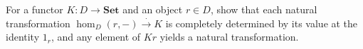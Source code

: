 For a functor $K: D \rightarrow \mathbf{Set}$ and an object $r \in D$, show that each natural transformation $\hom_D(r, -) \xrightarrow{\cdot} K$ is completely determined by its value at the identity $1_r$, and any element of $Kr$ yields a natural transformation.